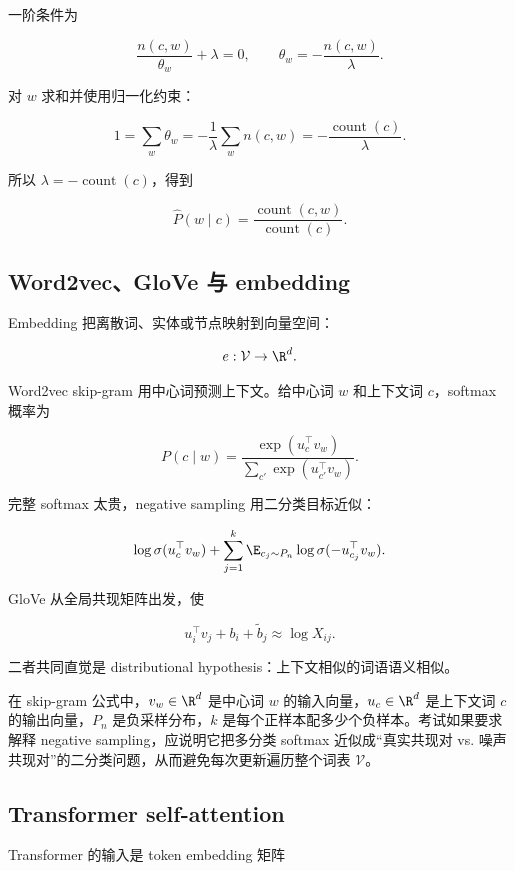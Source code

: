 一阶条件为

\[
  \frac{n(c,w)}{\theta_w}+\lambda=0,
  \qquad
  \theta_w=-\frac{n(c,w)}{\lambda}.
\]

对 \(w\) 求和并使用归一化约束：

\[
  1=\sum_w\theta_w
  =
  -\frac{1}{\lambda}
  \sum_w n(c,w)
  =
  -\frac{\operatorname{count}(c)}{\lambda}.
\]

所以 \(\lambda=-\operatorname{count}(c)\)，得到

\[
  \widehat P(w\mid c)
  =
  \frac{\operatorname{count}(c,w)}{\operatorname{count}(c)}.
\]

\subsection{Word2vec、GloVe 与 embedding}


Embedding 把离散词、实体或节点映射到向量空间：

\[
  e:\mathcal{V}\to\R^d.
\]

Word2vec skip-gram 用中心词预测上下文。给中心词 \(w\) 和上下文词 \(c\)，softmax 概率为

\[
  P(c\mid w)
  =
  \frac{\exp(u_c^\top v_w)}
  {\sum_{c'}\exp(u_{c'}^\top v_w)}.
\]

完整 softmax 太贵，negative sampling 用二分类目标近似：

\[
  \log\sigma(u_c^\top v_w)
  +
  \sum_{j=1}^{k}
  \E_{c_j\sim P_n}
  \log\sigma(-u_{c_j}^\top v_w).
\]

GloVe 从全局共现矩阵出发，使

\[
  u_i^\top v_j+b_i+\tilde b_j
  \approx
  \log X_{ij}.
\]

二者共同直觉是 distributional hypothesis：上下文相似的词语语义相似。

在 skip-gram 公式中，\(v_w\in\R^d\) 是中心词 \(w\) 的输入向量，\(u_c\in\R^d\) 是上下文词 \(c\) 的输出向量，\(P_n\) 是负采样分布，\(k\) 是每个正样本配多少个负样本。考试如果要求解释 negative sampling，应说明它把多分类 softmax 近似成“真实共现对 vs. 噪声共现对”的二分类问题，从而避免每次更新遍历整个词表 \(\mathcal{V}\)。

\subsection{Transformer self-attention}


Transformer 的输入是 token embedding 矩阵

